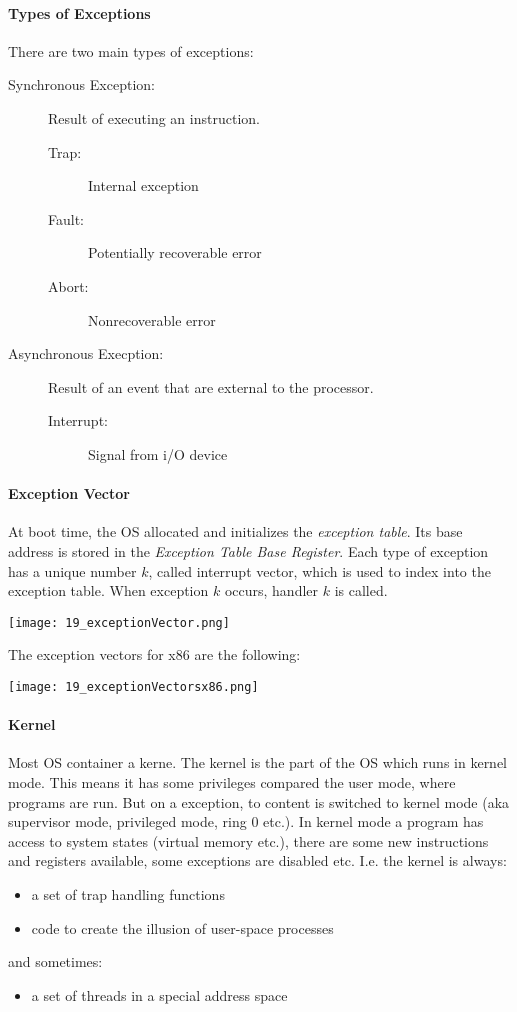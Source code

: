 \paragraph{Types of Exceptions}
There are two main types of exceptions:
\begin{description}
    \item[Synchronous Exception:] Result of executing an instruction.
        \begin{description}
            \item[Trap:] Internal exception
            \item[Fault:] Potentially recoverable error
            \item[Abort:] Nonrecoverable error
        \end{description}
    \item[Asynchronous Execption:] Result of an event that are external to the processor.
        \begin{description}
            \item[Interrupt:] Signal from i/O device
        \end{description}
\end{description}

\paragraph{Exception Vector}
At boot time, the OS allocated and initializes the \textit{exception table}. Its base address is stored in the \textit{Exception Table Base Register}. Each type of exception has a unique number $k$, called interrupt vector, which is used to index into the exception table. When exception $k$ occurs, handler $k$ is called.

\texttt{[image: 19\_exceptionVector.png]}

The exception vectors for x86 are the following:

\texttt{[image: 19\_exceptionVectorsx86.png]}

\paragraph{Kernel}
Most OS container a kerne. The kernel is the part of the OS which runs in kernel mode. This means it has some privileges compared the user mode, where programs are run. But on a exception, to content is switched to kernel mode (aka supervisor mode, privileged mode, ring $0$ etc.). In kernel mode a program has access to system states (virtual memory etc.), there are some new instructions and registers available, some exceptions are disabled etc.
I.e. the kernel is always:
\begin{itemize}
    \item a set of trap handling functions
    \item code to create the illusion of user-space processes
\end{itemize}
and sometimes:
\begin{itemize}
    \item a set of threads in a special address space
\end{itemize}

